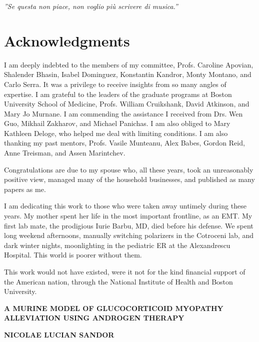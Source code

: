 \documentclass[12pt,english]{report}\usepackage[]{graphicx}\usepackage[]{color}
\begin{document}
\emph{''Se questa non piace, non voglio più scrivere di musica.''}



\pagebreak{}

\pagestyle{preamblepages}


\section{Acknowledgments}

I am deeply indebted to the members of my committee, Profs. Caroline
Apovian, Shalender Bhasin, Isabel Dominguez, Konstantin Kandror, Monty
Montano, and Carlo Serra. It was a privilege to receive insights from
so many angles of expertise. I am grateful to the leaders of the graduate
programs at Boston University School of Medicine, Profs. William Cruikshank,
David Atkinson, and Mary Jo Murnane. I am commending the assistance
I received from Drs. Wen Guo, Mikhail Zakharov, and Michael Panichas.
I am also obliged to Mary Kathleen Deloge, who helped me deal with
limiting conditions. I am also thanking my past mentors, Profs. Vasile
Munteanu, Alex Babes, Gordon Reid, Anne Treisman, and Assen Marintchev.

Congratulations are due to my spouse who, all these years, took an
unreasonably positive view, managed many of the household businesses,
and published as many papers as me.

I am dedicating this work to those who were taken away untimely during
these years. My mother spent her life in the most important frontline,
as an EMT. My first lab mate, the prodigious Iurie Barbu, MD, died
before his defense. We spent long weekend afternoons, manually switching
polarizers in the Cotroceni lab, and dark winter nights, moonlighting
in the pediatric ER at the Alexandrescu Hospital. This world is poorer
without them.

This work would not have existed, were it not for the kind financial
support of the American nation, through the National Institute of
Health and Boston University.\pagebreak{}

\begin{center}
\textbf{A MURINE MODEL OF GLUCOCORTICOID MYOPATHY ALLEVIATION USING
ANDROGEN THERAPY}
\par\end{center}

\begin{center}
\textbf{NICOLAE LUCIAN SANDOR}
\par\end{center}
\end{document}
